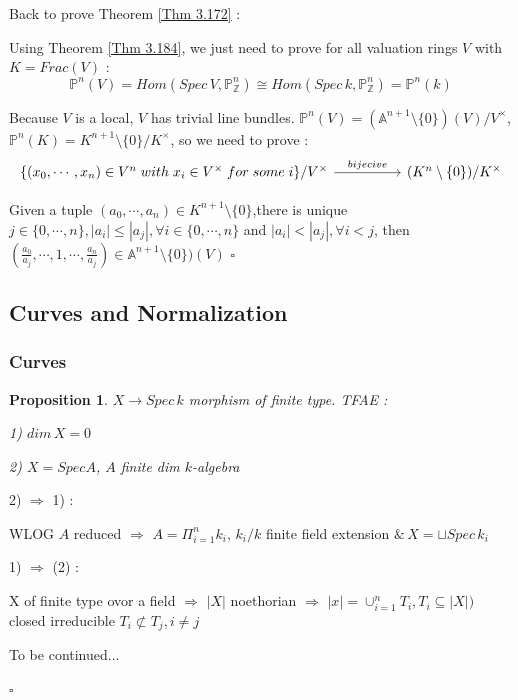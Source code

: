 \documentclass{article}
\newtheorem{proposition}[theorem]{Proposition}
\newenvironment{Proof}{{\noindent \indent \it Proof:\quad}}{\hfill $\square$\par}
\begin{document}
Back to prove Theorem \ref{Thm 3.172} :

\begin{Proof}
    Using Theorem \ref{Thm 3.184}, we just need to prove for all valuation rings $V$ with $K=Frac(V)$ : $$\mathbb P^n(V)=Hom(Spec\,V,\mathbb P^n_\mathbb Z) \cong Hom(Spec\,k,\mathbb P^n_\mathbb Z)=\mathbb P^n(k)$$

    Because $V$ is a local, $V$ has trivial line bundles. $\mathbb P^n(V)=(\mathbb A^{n+1}\setminus\{0\})(V)/V^\times$, $\mathbb P^n(K)=K^{n+1}\setminus \{0\}/K^\times$, so we need to prove :
    \[\begin{tikzcd}
	{\{(x_0,\cdots,x_n)\in V^n\; with\;x_i\in V^\times\;for\;some\;i\}/V^\times} && {(K^n\setminus\{0\})/K^\times}
	\arrow["bijecive", from=1-1, to=1-3]
    \end{tikzcd}\]

    Given a tuple $(a_0,\cdots,a_n)\in K^{n+1}\setminus\{0\}$,there is unique $j\in\{0,\cdots,n\},|a_i|\leq|a_j|,\forall i\in\{0,\cdots,n\}$ and $|a_i|< |a_j|,\forall i<j$, then $(\frac{a_0}{a_j},\cdots,1,\cdots,\frac{a_n}{a_j})\in \mathbb A^{n+1}\setminus\{0\})(V)$
\end{Proof}







\newpage
\subsection{Curves and Normalization}

\subsubsection{Curves}
\begin{proposition}
$X\to Spec\,k$ morphism of finite type. TFAE : 

1) $dim\,X = 0$

2) $X=Spec A$, $A$ finite dim $k$-algebra
\end{proposition}
\begin{Proof}
2) $\Rightarrow$ 1) :

WLOG $A$ reduced
$\Rightarrow$
$A = \Pi_{i=1}^n k_i ,\, k_i/k$ finite field extension
$\&\,X=\sqcup Spec\,k_i$

1) $\Rightarrow$ (2) :

X of finite type ovor a field
$\Rightarrow$
$|X|$ noethorian
$\Rightarrow$
$|x|=\cup_{i=1}^n T_i , T_i \subseteq |X|)$ closed
irreducible
$T_i \not\subset T_j, i\ne j$

To be continued...

\end{Proof}
\end{document}
